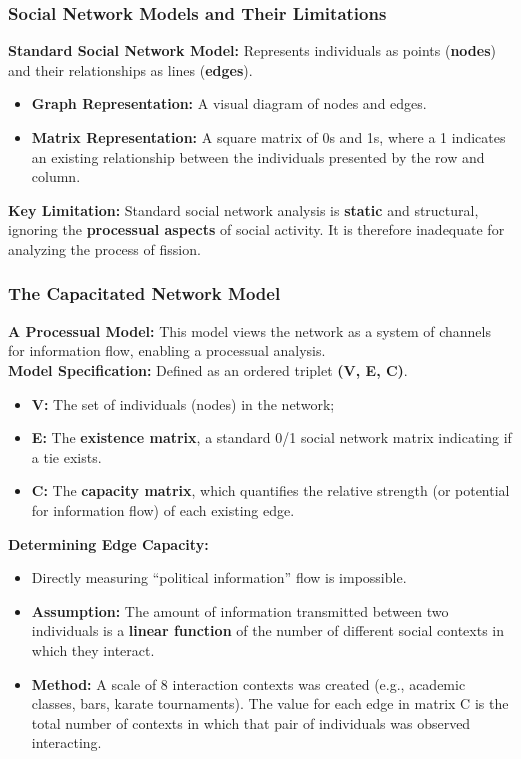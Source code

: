 \documentclass{article}
\begin{document}
    \subsubsection{Social Network Models and Their Limitations}

    \noindent \textbf{Standard Social Network Model:} Represents individuals
as points (\textbf{nodes}) and their relationships as lines (\textbf{edges}).
    \begin{itemize}
        \item \textbf{Graph Representation:} A visual diagram of nodes and
        edges.
        \item \textbf{Matrix Representation:} A square matrix of 0s and 1s,
        where a 1 indicates an existing relationship between the individuals
        presented by the row and column.
    \end{itemize}

    \noindent \textbf{Key Limitation:} Standard social network analysis is \textbf{static} and structural, ignoring the \textbf{processual aspects} of social activity. It is therefore inadequate for analyzing the process of fission.

    \subsubsection{The Capacitated Network Model}

    \noindent \textbf{A Processual Model:} This model views the network as a
system of channels for information flow, enabling a processual analysis.\\

    \noindent \textbf{Model Specification:} Defined as an ordered triplet \textbf{(V, E, C)}.
    \begin{itemize}
        \item \textbf{V:} The set of individuals (nodes) in the network;
        \item \textbf{E:} The \textbf{existence matrix}, a standard 0/1
        social network matrix indicating if a tie exists.
        \item \textbf{C:} The \textbf{capacity matrix}, which quantifies the
        relative strength (or potential for information flow) of each
        existing edge.
    \end{itemize}

    \noindent \textbf{Determining Edge Capacity:}
    \begin{itemize}
        \item Directly measuring ``political information'' flow is impossible.
        \item \textbf{Assumption:} The amount of information transmitted
        between two individuals is a \textbf{linear function} of the number
        of different social contexts in which they interact.
        \item \textbf{Method:} A scale of 8 interaction contexts was
        created (e.g., academic classes, bars, karate tournaments). The
        value for each edge in matrix C is the total number of contexts in
        which that pair of individuals was observed interacting.
    \end{itemize}
\end{document}
